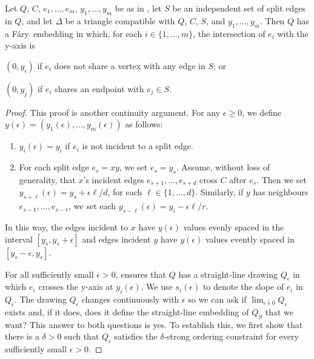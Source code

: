 \documentclass{patmorin}
\newcommand{\Fary}{Fáry}
\begin{document}
\begin{thm}
   Let $Q$, $C$, $e_1,\ldots,e_m$, $y_1,\ldots,y_m$ be as in
  , let $S$ be an independent set of split edges in $Q$,
  and let $\Delta$ be a triangle compatible with $Q$, $C$, $S$, and
  $y_1,\ldots,y_m$.  Then $Q$ has a \Fary\ embedding in which, for
  each $i\in\{1,\ldots,m\}$, the intersection of $e_i$ with the y-axis is
  \begin{compactenum}
     \item $(0,y_i)$ if $e_i$ does not share a vertex with any edge in $S$; or
     \item $(0,y_j)$ if $e_i$ shares an endpoint with $e_j\in S$.
  \end{compactenum}
\end{thm}

\begin{proof}
  This proof is another continuity argument. For any $\epsilon \ge 0$, we define
  $y(\epsilon)=(y_1(\epsilon),\ldots,y_m(\epsilon))$ as follows:
  \begin{enumerate}
    \item $y_i(\epsilon)= y_i$ if $e_i$ is not incident to a split edge.
    \item For each split edge $e_s=xy$, we set $e_s=y_s$.  Assume, without loss of generality, that $x$'s incident edges
  $e_{s+1},\ldots,e_{s+d}$ cross $C$ after $e_s$. Then we
  set $y_{s+\ell}(\epsilon)=y_s+\epsilon\ell/d$, for each
  $\ell\in\{1,\ldots,d\}$.  Similarly, if $y$ has neighbours
  $e_{s-1},\ldots,e_{s-r}$, we set each $y_{s-\ell}(\epsilon)=y_i -
  \epsilon\ell/r$. 
  \end{enumerate}
  In this way, the edges incident to $x$ have $y(\epsilon)$ values evenly
  spaced in the interval $[y_s,y_s+\epsilon]$ and edges incident $y$
  have $y(\epsilon)$ values evently spaced in $[y_s-\epsilon,y_s]$.

  For all sufficiently small $\epsilon >0$,  ensures that
  $Q$ has a straight-line drawing $Q_\epsilon$ in which $e_i$ crosses
  the y-axis at $y_i(\epsilon)$. We use $s_i(\epsilon)$ to denote the
  slope of $e_i$ in $Q_\epsilon$.  The drawing $Q_\epsilon$ changes
  continuously with $\epsilon$ so we can ask if $\lim_{\epsilon\downarrow
  0}Q_\epsilon$ exists and, if it does, does it define the straight-line 
  embedding of $Q_S$ that
  we want?  This answer to both questions is yes.  To establish this,
  we first show that there is a $\delta>0$ such that $Q_\epsilon$ satisfies
  the $\delta$-strong ordering constraint for every sufficiently small
  $\epsilon >0$.


\end{proof}
\end{document}
